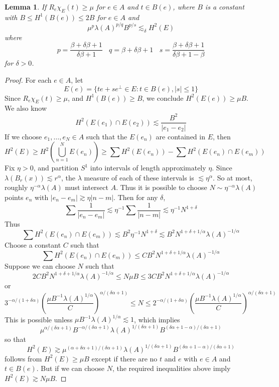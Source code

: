 \documentclass{article}
\theoremstyle{plain}
\newtheorem{lemma}[theorem]{Lemma}
\theoremstyle{remark}
\theoremstyle{definition}
\begin{document}
\begin{lemma}
	If $R_e \chi_E(t) \geq \mu$ for $e \in A$ and $t \in B(e)$, where $B$ is a constant with $B \leq H^1(B(e)) \leq 2B$ for $e \in A$ and
	\[ \mu^p \lambda(A)^{p/q} B^{p/s} \lesssim_\delta H^2(E) \]
	where
	\[ p = \frac{\beta + \delta \beta + 1}{\delta \beta + 1}\ \ \ \ q = \beta + \delta \beta + 1\ \ \ \ s = \frac{\beta + \delta \beta + 1}{\delta \beta + 1 - \beta} \]
	for $\delta > 0$.
\end{lemma}
\begin{proof}
	For each $e \in A$, let
	\[ E(e) = \{ te + se^\perp \in E: t \in B(e), |s| \leq 1 \} \]
	Since $R_e \chi_E(t) \geq \mu$, and $H^1(B(e)) \geq B$, we conclude $H^2(E(e)) \geq \mu B$. We also know
	\[ H^2(E(e_1) \cap E(e_2)) \lesssim \frac{B^2}{|e_1 - e_2|} \]
	If we choose $e_1, \dots, e_N \in A$ such that the $E(e_n)$ are contained in $E$, then
	\[ H^2(E) \geq H^2 \left( \bigcup_{n = 1}^N E(e_n) \right) \geq \sum H^2(E(e_n)) - \sum H^2(E(e_n) \cap E(e_m)) \]
	Fix $\eta > 0$, and partition $S^1$ into intervals of length approximately $\eta$. Since $\lambda(B_r(x)) \lesssim r^\alpha$, the $\lambda$ measure of each of these intervals is $\lesssim \eta^\alpha$. So at most, roughly $\eta^{-\alpha} \lambda(A)$ must intersect $A$. Thus it is possible to choose $N \sim \eta^{-\alpha} \lambda(A)$ points $e_n$ with $|e_n - e_m| \gtrsim \eta|n - m|$. Then for any $\delta$,
	\[ \sum \frac{1}{|e_n - e_m|} \lesssim \eta^{-1} \sum \frac{1}{|n - m|} \lesssim \eta^{-1} N^{1 + \delta} \]
	Thus
	\[ \sum H^2(E(e_n) \cap E(e_m)) \lesssim B^2 \eta^{-1} N^{1 + \delta} \lesssim B^2N^{1 + \delta + 1/\alpha} \lambda(A)^{-1/\alpha} \]
	Choose a constant $C$ such that
	\[ \sum H^2(E(e_n) \cap E(e_m)) \leq CB^2N^{1 + \delta + 1/\alpha} \lambda(A)^{-1/\alpha} \]
	Suppose we can choose $N$ such that
	\[ 2CB^2N^{1 + \delta + 1/\alpha} \lambda(A)^{-1/\alpha} \leq N \mu B \leq 3C B^2 N^{1 + \delta + 1/\alpha} \lambda(A)^{-1/\alpha} \]
	or
	\[ 3^{-\alpha/(1 + \delta \alpha)} \left( \frac{\mu B^{-1} \lambda(A)^{1/\alpha}}{C} \right)^{\alpha/(\delta \alpha + 1)} \leq N \leq 2^{-\alpha/(1 + \delta \alpha)} \left( \frac{\mu B^{-1} \lambda(A)^{1/\alpha}}{C} \right)^{\alpha/(\delta \alpha + 1)} \]
	This is possible unless $\mu B^{-1} \lambda(A)^{1/\alpha} \lesssim 1$, which implies
	\[ \mu^{\alpha/(\delta \alpha + 1)} B^{-\alpha/(\delta \alpha + 1)} \lambda(A)^{1/(\delta \alpha + 1)} B^{(\delta \alpha + 1 - \alpha)/(\delta \alpha + 1)} \]
	so that
	\[ H^2(E) \gtrsim \mu^{(\alpha + \delta \alpha + 1)/(\delta \alpha + 1)} \lambda(A)^{1/(\delta \alpha + 1)} B^{(\delta \alpha + 1 - \alpha)/(\delta \alpha + 1)} \]
	follows from $H^2(E) \geq \mu B$ except if there are no $t$ and $e$ with $e \in A$ and $t \in B(e)$. But if we can choose $N$, the required inequalities above imply $H^2(E) \gtrsim N\mu B$.
\end{proof}
\end{document}
